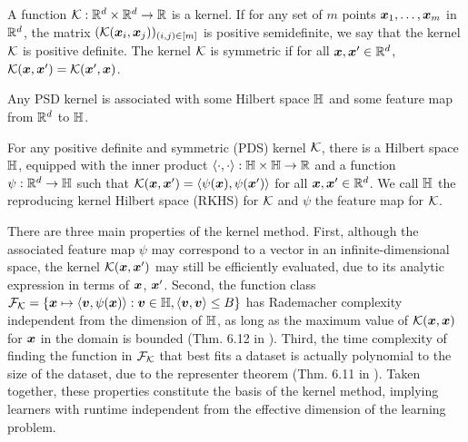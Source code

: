 \documentclass[11pt]{article} %
\numberwithin{equation}{section}
\begin{document}
\begin{definition}\label{definition:kernel}
     A function $\mathcal{K}: \mathbb{R}^d \times \mathbb{R}^d \to \mathbb{R}$ is a kernel. If for any set of $m$ points ${\bm{x}}_1,\dots,{\bm{x}}_m$ in $\mathbb{R}^d$, the matrix $(\mathcal{K}({\bm{x}}_i,{\bm{x}}_j))_{(i,j)\in[m]}$ is positive semidefinite, we say that the kernel $\mathcal{K}$ is positive definite. The kernel $\mathcal{K}$ is symmetric if for all ${\bm{x}},{\bm{x}}'\in\mathbb{R}^d$, $\mathcal{K}({\bm{x}},{\bm{x}}') = \mathcal{K}({\bm{x}}',{\bm{x}})$.
\end{definition}
Any PSD kernel is associated with some Hilbert space ${\mathbb{H}}$ and some feature map from $\mathbb{R}^d$ to ${\mathbb{H}}$.
\begin{fact}\label{fact:rkhs}
    For any positive definite and symmetric (PDS) kernel $\mathcal{K}$, there is a Hilbert space ${\mathbb{H}}$, equipped with the inner product $\langle \cdot, \cdot\rangle:{\mathbb{H}} \times {\mathbb{H}} \to \mathbb{R}$ and a function $\psi:\mathbb{R}^d \to {\mathbb{H}}$ such that $\mathcal{K}({\bm{x}},{\bm{x}}') = \langle \psi({\bm{x}}), \psi({\bm{x}}')\rangle$ for all ${\bm{x}},{\bm{x}}'\in\mathbb{R}^d$. We call ${\mathbb{H}}$ the reproducing kernel Hilbert space (RKHS) for $\mathcal{K}$ and $\psi$ the feature map for $\mathcal{K}$.
\end{fact}
There are three main properties of the kernel method. First, although the associated feature map $\psi$ may correspond to a vector in an infinite-dimensional space, the kernel $\mathcal{K}({\bm{x}},{\bm{x}}')$ may still be efficiently evaluated, due to its analytic expression in terms of ${\bm{x}}$, ${\bm{x}}'$. Second, the function class ${\mathcal{F}}_{\mathcal{K}} = \{{\bm{x}}\mapsto \langle {\bm{v}}, \psi({\bm{x}})\rangle: {\bm{v}}\in{\mathbb{H}}, \langle {\bm{v}}, {\bm{v}}\rangle \le B\}$ has Rademacher complexity independent from the dimension of ${\mathbb{H}}$, as long as the maximum value of $\mathcal{K}({\bm{x}},{\bm{x}})$ for ${\bm{x}}$ in the domain is bounded (Thm. 6.12 in \cite{mohri2018foundations}). Third, the time complexity of finding the function in ${\mathcal{F}}_{\mathcal{K}}$ that best fits a dataset is actually polynomial to the size of the dataset, due to the representer theorem (Thm. 6.11 in \cite{mohri2018foundations}). Taken together, these properties constitute the basis of the kernel method, implying learners with runtime independent from the effective dimension of the learning problem. 
\end{document}
